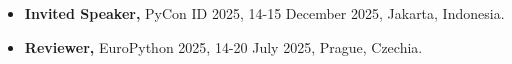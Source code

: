 

\begin{itemize}

\item {{\fontsize{9.5pt}{1em}\bodyfont\color{text}\textbf{Invited Speaker,}}} {{\fontsize{8.5pt}{1em}\bodyfont\color{text}PyCon ID 2025, 14-15 December 2025, Jakarta, Indonesia.}}
\vspace{-.6em}


\item {{\fontsize{9.5pt}{1em}\bodyfont\color{text}\textbf{Reviewer,}}} {{\fontsize{8.5pt}{1em}\bodyfont\color{text}EuroPython 2025, 14-20 July 2025, Prague, Czechia.}}
\vspace{-.6em}

\end{itemize}


